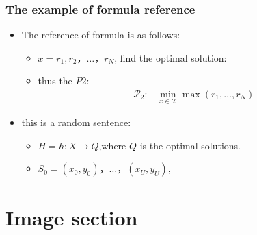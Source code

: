 \documentclass{beamer}%
\begin{document}
\begin{frame}
	\frametitle{The example of formula reference}
	\begin{itemize}			
		\item<1->The reference of formula is as follows:
		      \begin{itemize}
			      \item<1->$x={r_1,r_2，…，r_N}$, find the optimal solution:
			      \item<1->thus the $P2$:
			            \begin{align*} \mathcal {P}_2: & \min \limits _{x \in \mathcal {X}} \max ({r_1, \ldots, r_N}) \tag{8}
			            \end{align*}
			            
		      \end{itemize}
		\item<1->this is a random sentence:
		      \begin{itemize}
			      \item<1->$H={h:X→Q}$,where $Q$ is the optimal solutions.
			      \item<1->$S_0={(x_0,y_0)，…，(x_U,y_U)},$
		      \end{itemize}
	\end{itemize}
\end{frame}


\section{Image section}
\end{document}

